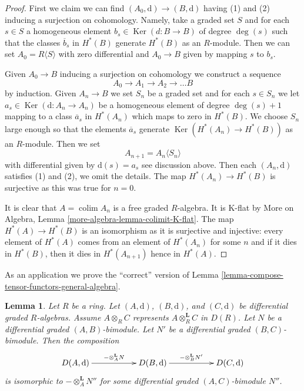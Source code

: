 \documentclass{stacks-project}
\theoremstyle{plain}
\newtheorem{lemma}[subsection]{Lemma}
\theoremstyle{definition}
\theoremstyle{remark}
\numberwithin{equation}{subsection}
\def\colim{\mathop{\mathrm{colim}}\nolimits}
\def\Ker{\mathop{\mathrm{Ker}}}
\begin{document}
\begin{proof}
First we claim we can find $(A_0, \text{d}) \to (B, \text{d})$
having (1) and (2) inducing a surjection on cohomology.
Namely, take a graded set $S$ and for each $s \in S$
a homogeneous element $b_s \in \Ker(d : B \to B)$ of degree $\deg(s)$
such that the classes $\overline{b}_s$ in $H^*(B)$
generate $H^*(B)$ as an $R$-module.
Then we can set $A_0 = R\langle S \rangle$ with zero differential
and $A_0 \to B$ given by mapping $s$ to $b_s$.

\medskip\noindent
Given $A_0 \to B$ inducing a surjection on cohomology we construct
a sequence
$$
A_0 \to A_1 \to A_2 \to \ldots B
$$
by induction. Given $A_n \to B$ we set $S_n$ be a graded set
and for each $s \in S_n$ we let $a_s \in \Ker(\text{d} : A_n \to A_n)$
be a homogeneous element of degree $\deg(s) + 1$
mapping to a class $\overline{a}_s$ in $H^*(A_n)$
which maps to zero in $H^*(B)$. We choose $S_n$ large enough
so that the elements $\overline{a}_s$ generate $\Ker(H^*(A_n) \to H^*(B))$
as an $R$-module. Then we set
$$
A_{n + 1} = A_n\langle S_n \rangle
$$
with differential given by $\text{d}(s) = a_s$ see discussion above.
Then each $(A_n, \text{d})$ satisfies (1) and (2), we omit the details.
The map $H^*(A_n) \to H^*(B)$ is surjective as this was true for $n = 0$.

\medskip\noindent
It is clear that $A = \colim A_n$ is a free graded $R$-algebra.
It is K-flat by More on Algebra, Lemma \ref{more-algebra-lemma-colimit-K-flat}.
The map $H^*(A) \to H^*(B)$ is an isomorphism as it is surjective
and injective: every element of $H^*(A)$ comes from an element of
$H^*(A_n)$ for some $n$ and if it dies in $H^*(B)$, then it dies
in $H^*(A_{n + 1})$ hence in $H^*(A)$.
\end{proof}

\noindent
As an application we prove the ``correct'' version of
Lemma \ref{lemma-compose-tensor-functors-general-algebra}.

\begin{lemma}
\label{lemma-compose-tensor-functors-tor}
Let $R$ be a ring. Let $(A, \text{d})$, $(B, \text{d})$, and
$(C, \text{d})$ be differential graded $R$-algebras. Assume
$A \otimes_R C$ represents $A \otimes^\mathbf{L}_R C$ in $D(R)$.
Let $N$ be a differential graded $(A, B)$-bimodule.
Let $N'$ be a differential graded $(B, C)$-bimodule.
Then the composition
$$
\xymatrix{
D(A, \text{d}) \ar[rr]^{- \otimes_A^\mathbf{L} N} & &
D(B, \text{d}) \ar[rr]^{- \otimes_B^\mathbf{L} N'} & &
D(C, \text{d})
}
$$
is isomorphic to $- \otimes_A^\mathbf{L} N''$ for some differential graded
$(A, C)$-bimodule $N''$.
\end{lemma}
\end{document}
